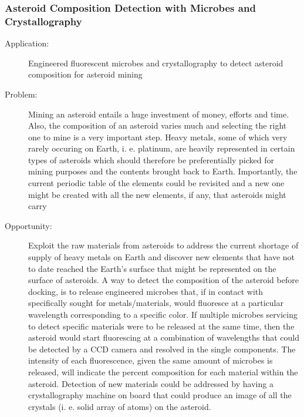  \subsubsection{Asteroid Composition Detection with Microbes and Crystallography}
\begin{description}
\item[Application:] Engineered fluorescent microbes and crystallography to detect asteroid composition for asteroid mining
\item[Problem:] Mining an asteroid entails a huge investment of money, efforts and time. Also, the composition of an asteroid varies much and selecting the right one to mine is a very important step. Heavy metals, some of which very rarely occuring on Earth, i. e. platinum, are heavily represented in certain types of asteroids \cite{Kargel} which should therefore be preferentially picked for mining purposes and the contents brought back to Earth. Importantly, the current periodic table of the elements could be revisited and a new one might be created with all the new elements, if any, that asteroids might carry
\item[Opportunity:] Exploit the raw materials from asteroids to address the current shortage of supply of heavy metals on Earth and discover new elements that have not to date reached the Earth's surface that might be represented on the surface of asteroids. A way to detect the composition of the asteroid before docking, is to release engineered microbes that, if in contact with specifically sought for metals/materials, would fluoresce at a particular wavelength corresponding to a specific color. If multiple microbes servicing to detect specific materials were to be released at the same time, then the asteroid would start fluorescing at a combination of wavelengths that could be detected by a \gls{CCD} camera and resolved in the single components. The intensity of each fluorescence, given the same amount of microbes is released, will indicate the percent composition for each material within the asteroid. Detection of new materials could be addressed by having a crystallography machine on board that could produce an image of all the crystals (i. e. solid array of atoms) on the asteroid.


\end{description}
